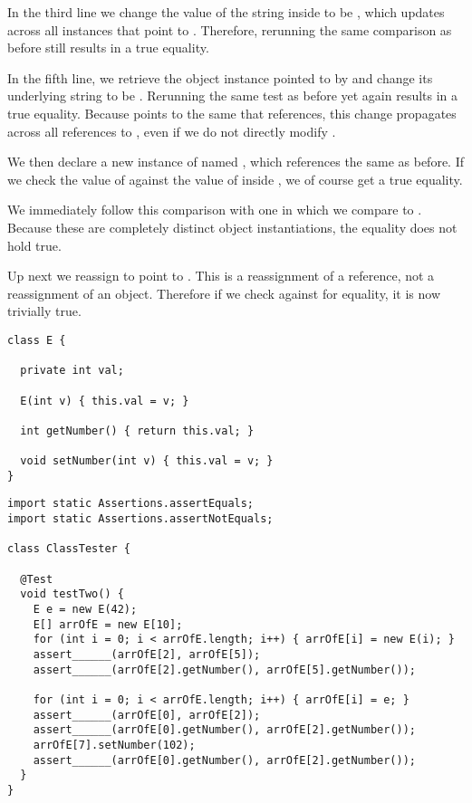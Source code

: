 In the third line we change the value of the string inside  to be , which updates across all instances that point to . Therefore, rerunning the same comparison as before still results in a true equality.

In the fifth line, we retrieve the  object instance pointed to by  and change its underlying string to be . Rerunning the same test as before yet again results in a true equality. Because  points to the same  that  references, this change propagates across all references to , even if we do not directly modify .

We then declare a new instance of  named , which references the same  as before. If we check the value of  against the value of  inside , we of course get a true equality.

We immediately follow this comparison with one in which we compare  to . Because these are completely distinct object instantiations, the equality does not hold true.

Up next we reassign  to point to . This is a reassignment of a reference, not a reassignment of an object. Therefore if we check  against  for equality, it is now trivially true.


\begin{lstlisting}[language=MyJava]
class E {

  private int val;

  E(int v) { this.val = v; }

  int getNumber() { return this.val; }

  void setNumber(int v) { this.val = v; }
}
\end{lstlisting}

\begin{lstlisting}[language=MyJava]
import static Assertions.assertEquals;
import static Assertions.assertNotEquals;

class ClassTester {

  @Test
  void testTwo() {
    E e = new E(42);
    E[] arrOfE = new E[10];
    for (int i = 0; i < arrOfE.length; i++) { arrOfE[i] = new E(i); }
    assert______(arrOfE[2], arrOfE[5]);
    assert______(arrOfE[2].getNumber(), arrOfE[5].getNumber());

    for (int i = 0; i < arrOfE.length; i++) { arrOfE[i] = e; }
    assert______(arrOfE[0], arrOfE[2]);
    assert______(arrOfE[0].getNumber(), arrOfE[2].getNumber());
    arrOfE[7].setNumber(102);
    assert______(arrOfE[0].getNumber(), arrOfE[2].getNumber());
  }
}
\end{lstlisting}


